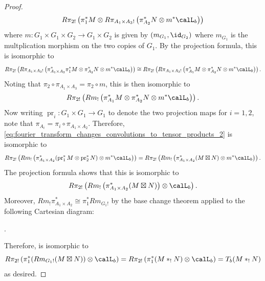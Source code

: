 \begin{proof}
    $$R\pi_{2!} \left( \pi_1^* M \otimes R\pi_{A_1 \times A_3 !}  \left( \pi_{A_2}^* N \otimes m^* \calL_b \right) \right)$$
    where $m: G_1 \times G_1 \times G_2 \to G_1 \times G_2$ is given by $(m_{G_1}, \id_{G_2})$ where $m_{G_1}$ is the multplication morphism on the two copies of $G_1$. By the projection formula, this is isomorphic to 
    $$R\pi_{2!} \left( R\pi_{A_1 \times A_3 !} \left( \pi_{A_1 \times A_3}^* \pi_1^* M \otimes \pi_{A_2}^* N \otimes m^* \calL_b  \right) \right) \cong R\pi_{2!} \left( R\pi_{A_1 \times A_3 !} \left( \pi_{A_1}^* M \otimes    \pi_{A_2}^* N \otimes m^* \calL_b  \right) \right).$$
    Noting that $\pi_2 \circ \pi_{A_1 \times A_3} = \pi_2 \circ m$, this is then isomorphic to 
    \begin{equation} \label{eq:fourier_transform_changes_convolutions_to_tensor_products_2}
    R\pi_{2!} \left( Rm_! \left( \pi_{A_1}^* M \otimes    \pi_{A_2}^* N \otimes m^* \calL_b  \right) \right).
    \end{equation}
    Now writing $\operatorname{pr}_i:G_1 \times G_1 \to G_1$ to denote the two projection maps for $i=1,2$, note that $\pi_{A_i} = \pi_{i} \circ \pi_{A_1 \times A_2}$. Therefore, \eqref{eq:fourier_transform_changes_convolutions_to_tensor_products_2} is isomorphic to 
    \begin{equation*} 
    R\pi_{2!} \left( Rm_! \left( \pi_{A_1 \times A_2}^*(\operatorname{pr}_1^* M \otimes \operatorname{pr}_2^* N) \otimes m^* \calL_b  \right) \right) = 
    R\pi_{2!} \left( Rm_! \left( \pi_{A_1 \times A_2}^*(M \boxtimes N) \otimes m^* \calL_b  \right) \right).
    \end{equation*}
    The projection formula shows that this is isomorphic to 
    \begin{equation*} \label{eq:fourier_transform_changes_convolutions_to_tensor_products_3}
        R\pi_{2!} \left( Rm_! \left( \pi_{A_1 \times A_2}^*(M \boxtimes N) \right) \otimes \calL_b   \right).
    \end{equation*}
    Moreover, $Rm_! \pi_{A_1 \times A_2}^* \cong \pi_1^* Rm_{G_1!}$ by the base change theorem applied to the following Cartesian diagram:
    \begin{center}
    .
    \end{center}
    Therefore,  is isomorphic to 
    \begin{equation*} 
        R\pi_{2!} \left( \pi_1^* (Rm_{G_1!} (M \boxtimes N))  \otimes \calL_b   \right) = R\pi_{2!} \left( \pi_1^* (M *_! N)  \otimes \calL_b   \right) = T_b(M *_! N)
    \end{equation*}
    as desired.
\end{proof}


